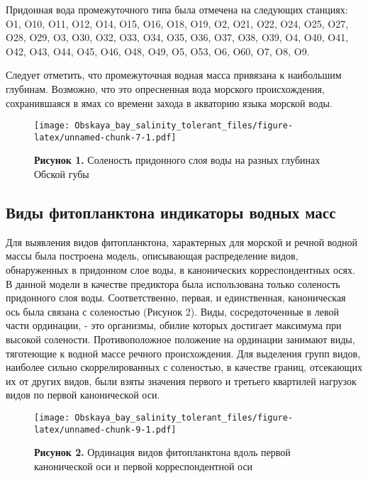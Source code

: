 \documentclass[
]{article}
\begin{document}
Придонная вода промежуточного типа была отмечена на следующих станциях:
O1, O10, O11, O12, O14, O15, O16, O18, O19, O2, O21, O22, O24, O25, O27,
O28, O29, O3, O30, O32, O33, O34, O35, O36, O37, O38, O39, O4, O40, O41,
O42, O43, O44, O45, O46, O48, O49, O5, O53, O6, O60, O7, O8, O9.

Следует отметить, что промежуточная водная масса привязана к наибольшим
глубинам. Возможно, что это опресненная вода морского происхождения,
сохранившаяся в ямах со времени захода в акваторию языка морской воды.

\begin{figure}
\centering
\texttt{[image: Obskaya\_bay\_salinity\_tolerant\_files/figure-latex/unnamed-chunk-7-1.pdf]}
\caption{\textbf{Рисунок 1.} Соленость придонного слоя воды на разных
глубинах Обской губы}
\end{figure}

\hypertarget{ux432ux438ux434ux44b-ux444ux438ux442ux43eux43fux43bux430ux43dux43aux442ux43eux43dux430-ux438ux43dux434ux438ux43aux430ux442ux43eux440ux44b-ux432ux43eux434ux43dux44bux445-ux43cux430ux441ux441}{%
\subsection{Виды фитопланктона индикаторы водных
масс}\label{ux432ux438ux434ux44b-ux444ux438ux442ux43eux43fux43bux430ux43dux43aux442ux43eux43dux430-ux438ux43dux434ux438ux43aux430ux442ux43eux440ux44b-ux432ux43eux434ux43dux44bux445-ux43cux430ux441ux441}}

Для выявления видов фитопланктона, характерных для морской и речной
водной массы была построена модель, описывающая распределение видов,
обнаруженных в придонном слое воды, в канонических корреспондентных
осях. В данной модели в качестве предиктора была использована только
соленость придонного слоя воды. Соответственно, первая, и единственная,
каноническая ось была связана с соленостью (Рисунок 2). Виды,
сосредоточенные в левой части ординации, - это организмы, обилие которых
достигает максимума при высокой солености. Противоположное положение на
ординации занимают виды, тяготеющие к водной массе речного
происхождения. Для выделения групп видов, наиболее сильно
скоррелированных с соленостью, в качестве границ, отсекающих их от
других видов, были взяты значения первого и третьего квартилей нагрузок
видов по первой канонической оси.

\begin{figure}
\centering
\texttt{[image: Obskaya\_bay\_salinity\_tolerant\_files/figure-latex/unnamed-chunk-9-1.pdf]}
\caption{\textbf{Рисунок 2.} Ординация видов фитопланктона вдоль первой
канонической оси и первой корреспондентной оси}
\end{figure}
\end{document}
